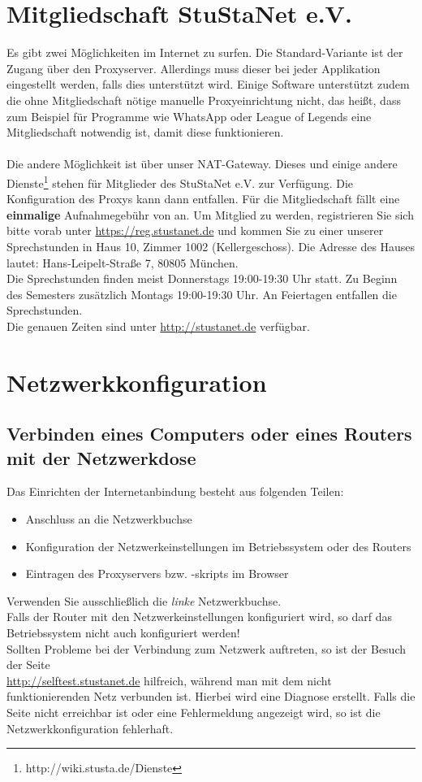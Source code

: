 \documentclass[a4paper,12pt]{scrartcl}
\begin{document}

\section*{Mitgliedschaft StuStaNet e.V.}
Es gibt zwei Möglichkeiten im Internet zu surfen. Die Standard-Variante ist der Zugang über den Proxyserver. Allerdings muss dieser bei jeder Applikation eingestellt werden, falls dies unterstützt wird. Einige Software unterstützt zudem die ohne Mitgliedschaft nötige manuelle Proxyeinrichtung nicht, das heißt, dass zum Beispiel für Programme wie WhatsApp oder League of Legends eine Mitgliedschaft notwendig ist, damit diese funktionieren.\\
\\
Die andere Möglichkeit ist über unser NAT-Gateway. Dieses und einige andere Dienste\footnote{http://wiki.stusta.de/Dienste} stehen für Mitglieder des StuStaNet e.V. zur Verfügung. Die Konfiguration des Proxys kann dann entfallen.
Für die Mitgliedschaft fällt eine \textbf{einmalige} Aufnahmegebühr von  an. Um Mitglied zu werden, registrieren Sie sich bitte vorab unter \mbox{\url{https://reg.stustanet.de}} und kommen Sie zu einer unserer Sprechstunden in Haus 10, Zimmer 1002 (Kellergeschoss). Die Adresse des Hauses lautet: Hans-Leipelt-Straße 7, 80805 München. 
\\
Die Sprechstunden finden meist Donnerstags 19:00-19:30 Uhr statt. Zu Beginn des Semesters zusätzlich Montags 19:00-19:30 Uhr. An Feiertagen entfallen die Sprechstunden.
\\
Die genauen Zeiten sind unter \mbox{\url{http://stustanet.de}} verfügbar.

\section*{Netzwerkkonfiguration}
\subsection*{Verbinden eines Computers oder eines Routers mit der Netzwerkdose}

Das Einrichten der Internetanbindung besteht aus folgenden Teilen:
\begin{itemize}
	\item Anschluss an die Netzwerkbuchse
	\item Konfiguration der Netzwerkeinstellungen im Betriebssystem oder des Routers
	\item Eintragen des Proxyservers bzw. -skripts im Browser
\end{itemize}
Verwenden Sie ausschließlich die \emph{linke} Netzwerkbuchse.\\
Falls der Router mit den Netzwerkeinstellungen konfiguriert wird, so darf das Betriebssystem nicht auch konfiguriert werden!\\
Sollten Probleme bei der Verbindung zum Netzwerk auftreten, so ist der Besuch der Seite\\
\mbox{\url{http://selftest.stustanet.de}} hilfreich, während man mit dem nicht funktionierenden Netz verbunden ist. Hierbei wird eine Diagnose erstellt. Falls die Seite nicht erreichbar ist oder eine Fehlermeldung angezeigt wird, so ist die Netzwerkkonfiguration fehlerhaft.
 
\end{document}
